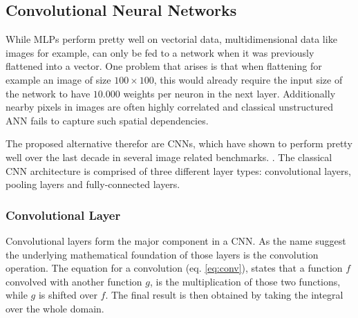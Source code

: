 




\subsection{Convolutional Neural Networks}

While \acp{MLP} perform pretty well on vectorial data, multidimensional data like images for example, can only be fed to a network when it was previously flattened into a vector.
One problem that arises is that when flattening for example an image of size $100 \times 100$, this would already require the input size of the network to have $10.000$ weights per neuron in the next layer.
Additionally nearby pixels in images are often highly correlated and classical unstructured \ac{ANN} fails to capture such spatial dependencies. \cite{lecun_lenet}

The proposed alternative therefor are \acp{CNN}, which have shown to perform pretty well over the last decade in several image related benchmarks. \cite{inception} \cite{resnet} \cite{densenet}.
The classical \ac{CNN} architecture is comprised of three different layer types: convolutional layers, pooling layers and fully-connected layers.

\subsubsection{Convolutional Layer}
Convolutional layers form the major component in a \ac{CNN}.
As the name suggest the underlying mathematical foundation of those layers is the convolution operation.
The equation for a convolution (eq. \ref{eq:conv}), states that a function $f$ convolved with another function $g$, is the multiplication of those two functions, while $g$ is shifted over $f$.
The final result is then obtained by taking the integral over the whole domain. \cite{dl}

